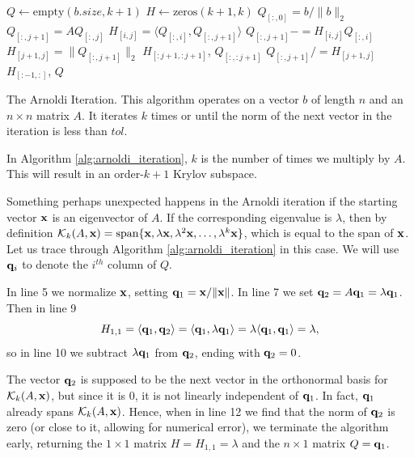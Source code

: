 \begin{algorithm}
\begin{algorithmic}[1]
	\State $Q \gets \text{empty}\left(b.size, k+1\right)$	
	\State $H \gets \text{zeros}\left( k+1, k\right)$
	\State $Q_{[:,0]} = b/\|b\|_2$							
								
		\State $Q_{[:,j+1]} = AQ_{[:,j]}$		
							
			\State $H_{[i,j]} = \langle Q_{[:,i]}, Q_{[:,j+1]}\rangle$		
			\State $Q_{[:,j+1]} -= H_{[i,j]} Q_{[:,i]}$
		\EndFor
		\State $H_{[j+1,j]} = \|Q_{[:,j+1]}\|_2$			
            					
			\State {} $H_{[:j+1,:j+1]}$, $Q_{[:,:j+1]}$
		\EndIf
		\State $Q_{[:,j+1]} /= H_{[j+1,j]}$				
	\EndFor
	\State {} $H_{[:-1, :]}$, $Q$			
\EndProcedure
\end{algorithmic}
\caption{The Arnoldi Iteration. This algorithm operates on a vector $b$ of length $n$ and an $n \times n$ matrix $A$. It iterates $k$ times or until the norm of the next vector in the iteration is less than $tol$.}
\label{alg:arnoldi_iteration}
\end{algorithm}


In Algorithm \ref{alg:arnoldi_iteration}, $k$ is the number of times we multiply by $A$.
This will result in an order-$k+1$ Krylov subspace.

Something perhaps unexpected happens in the Arnoldi iteration if the starting vector ${\bf x}$ is an eigenvector of $A$.
If the corresponding eigenvalue is $\lambda$, then by definition $\mathcal{K}_k(A, {\bf x})=\text{span}\{{\bf x}, \lambda {\bf x}, \lambda^2{\bf x}, \ldots, \lambda^k {\bf x}\}$, which is equal to the span of ${\bf x}$.
Let us trace through Algorithm \ref{alg:arnoldi_iteration} in this case. We will use ${\bf q}_i$ to denote the $i^{th}$ column of $Q$.

In line 5 we normalize ${\bf x}$, setting ${\bf q}_1 = {\bf x}/\|{\bf x}\|$. 
In line 7 we set ${\bf q}_2 = A{\bf q}_1 = \lambda {\bf q}_1$.
Then in line 9
\[
H_{1,1} = \langle {\bf q}_1, {\bf q}_2 \rangle = \langle {\bf q}_1, \lambda {\bf q}_1 \rangle = \lambda \langle {\bf q}_1, {\bf q}_1 \rangle = \lambda,
\]
so in line 10 we subtract $\lambda {\bf q}_1$ from ${\bf q}_2$, ending with ${\bf q}_2=0$.

The vector ${\bf q}_2$ is supposed to be the next vector in the orthonormal basis for $\mathcal{K}_k(A, {\bf x})$, but since it is 0, it is not linearly independent of ${\bf q}_1$. In fact, ${\bf q}_1$ already spans $\mathcal{K}_k(A, {\bf x})$.
Hence, when in line 12 we find that the norm of ${\bf q}_2$ is zero (or close to it, allowing for numerical error), we terminate the algorithm early, returning the $1\times 1$ matrix $H = H_{1, 1}=\lambda$ and the $n\times 1$ matrix $Q = {\bf q}_1$.

